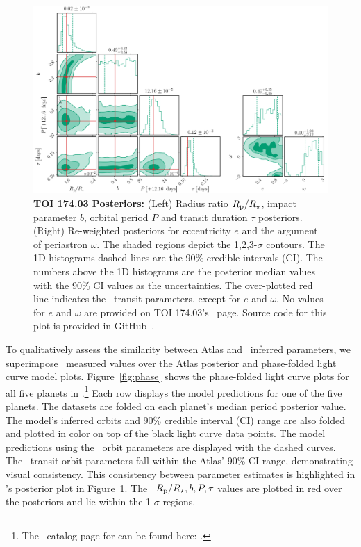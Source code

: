 \documentclass[floatfix,ApJL,twocolumn]{aastex631}
\begin{document}
\begin{figure}\label{fig:posteriors}
    \centering
    \includegraphics[width=0.9\linewidth]{figures/combined_posterior.png}
    \caption{\textbf{TOI 174.03 Posteriors:} (Left) Radius ratio $R_{\rm p}/R_\star$, impact parameter $b$, orbital period $P$ and transit duration $\tau$ posteriors. (Right) Re-weighted posteriors for eccentricity $e$ and the argument of periastron $\omega$. 
    The shaded regions depict the 1,2,3-$\sigma$ contours. The 1D histograms dashed lines are the 90\% credible intervals (CI). 
    The numbers above the 1D histograms are the posterior median values with the 90\% CI values as the uncertainties.
    The over-plotted red line indicates the \exofop\ transit parameters, except for $e$ and $\omega$.
    No values for $e$ and $\omega$ are provided on {TOI 174.03}'s \exofop\ page.
    Source code for this plot is provided in GitHub~\paperPlotsLink.}
\end{figure}


To qualitatively assess the similarity between Atlas and \exofop\ inferred parameters, we superimpose \exofop\ measured values over the Atlas posterior and phase-folded light curve model plots.
Figure~\ref{fig:phase} shows the phase-folded light curve plots for all five planets in .\footnote{The \tessAtlas\ catalog page for  can be found here: .}
Each row displays the model predictions for one of the five planets.
The datasets are folded on each planet's median period posterior value.
The model's inferred orbits and 90\% credible interval (CI) range are also folded and plotted in color on top of the black light curve data points.
The model predictions using the \exofop\ orbit parameters are displayed with the dashed curves. 
The \exofop\ transit orbit parameters fall within the Atlas' 90\% CI range, demonstrating visual consistency. 
This consistency between parameter estimates is highlighted in 's posterior plot in Figure~\ref{fig:posteriors}.
The \exofop\ $R_{\rm p}/R_{\star}, b, P, \tau$ values are plotted in red over the posteriors and lie within the 1-$\sigma$ regions.
\end{document}
